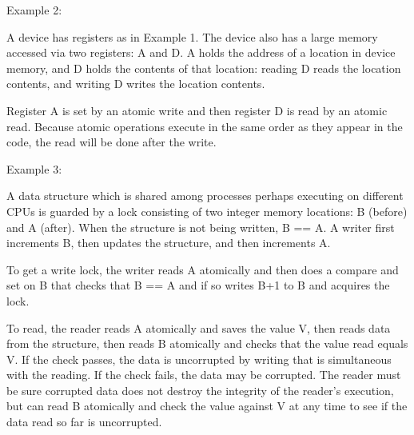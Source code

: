 \documentclass[12pt]{article}
\newenvironment{indpar}[1][0.3in]%
	{\begin{list}{}%
		     {\setlength{\itemsep}{0in}%
		      \setlength{\topsep}{0in}%
		      \setlength{\parsep}{1ex}%
		      \setlength{\labelwidth}{#1}%
		      \setlength{\leftmargin}{#1}%
		      \addtolength{\leftmargin}{\labelsep}}%
	 \item}%
	{\end{list}}
\begin{document}
Example 2:
\begin{indpar}
A device has registers as in Example 1.  The device also has a large
memory accessed via two registers: A and D.  A holds the address of
a location in device memory, and D holds the contents of that location:
reading D reads the location contents, and writing D writes the location
contents.

Register A is set by an atomic write and then register D
is read by an atomic read.  Because atomic operations execute in the
same order as they appear in the code, the read will be done after the
write.
\end{indpar}

Example 3:
\begin{indpar}
A data structure which is shared among processes perhaps executing
on different CPUs is guarded by a lock consisting of two integer
memory locations: B (before) and A (after).  When the structure is
not being written, B == A.  A writer first increments B, then
updates the structure, and then increments A.

To get a write lock, the writer reads A atomically and then does
a compare and set on B that checks that B == A and if so writes
B+1 to B and acquires the lock.

To read, the reader reads A atomically and saves the value V,
then reads data from the structure, then reads B atomically and
checks that the value read equals V.  If the check passes, the data
is uncorrupted by writing that is simultaneous with the reading.
If the check fails, the data may be corrupted.  The reader must be
sure corrupted data does not destroy the integrity of the reader's execution,
but can read B atomically and check the value against V
at any time to see if the data read so far is uncorrupted.
\end{indpar}
\end{document}
